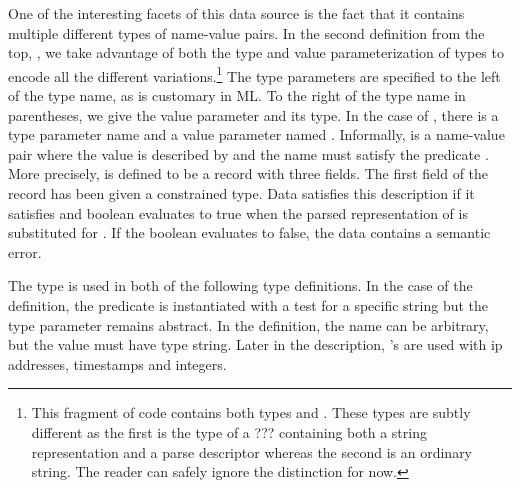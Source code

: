 One of the interesting facets of this data source is the fact that it
contains multiple different types of name-value pairs.  In the second
definition from the top, , we take advantage of both the type
and value parameterization of types to encode all the different
variations.\footnote{This fragment of code contains both types
   and .  These types are subtly different as
  the first is the type of a ??? containing both a string
  representation and a parse descriptor whereas the second is an
  ordinary string.  The reader can safely ignore the distinction for
  now.}  The type parameters are specified to the left of the type
name, as is customary in ML.  To the right of the type name in
parentheses, we give the value parameter and its type.  In the case of
, there is a type parameter name  and a value
parameter named .  Informally,  is a
name-value pair where the value is described by  and the
name must satisfy the predicate .  More precisely,  is
defined to be a record with three fields.  The first field of the
record has been given a constrained type. Data  satisfies this description if it
satisfies  and boolean  evaluates to true when the parsed
representation of  is substituted for .  If the boolean
evaluates to false, the data contains a semantic error.

The  type is used in both of the following type definitions.
In the case of the  definition, the predicate is instantiated
with a test for a specific string but the type parameter remains 
abstract.  In the  
definition, the name can be arbitrary, but the value must have 
type string. Later in the description, 's
are used with ip addresses, timestamps and integers. 


